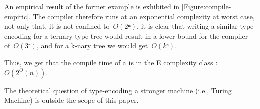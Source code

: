 An empirical result of the former example is exhibited in \cref{Figure:compile-empiric}.
The \Java compiler therefore runs at an exponential complexity at worst case,
  not only that, it is not confined to~$O(2ⁿ)$, it is clear that
  writing a similar type-encoding for a ternary type tree would result in
  a lower-bound for the \Java compiler of~$O(3ⁿ)$, and for a k-nary tree
  we would get~$O(kⁿ)$.

Thus, we get that the compile time of a \Java is in the E complexity class :~$O(2^O(n))$.

The theoretical question of type-encoding a stronger machine (i.e., Turing Machine)
  is outside the scope of this paper.
